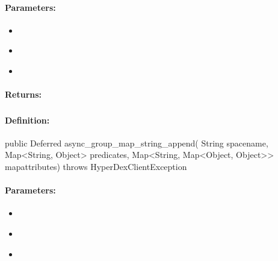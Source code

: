 \paragraph{Parameters:}
\begin{itemize}[noitemsep]
\item {}\\

\item {}\\

\item {}\\

\end{itemize}

\paragraph{Returns:}


\pagebreak
\subsubsection{}
\label{api:java:async_group_map_string_append}


\paragraph{Definition:}
\begin{javacode}
public Deferred async_group_map_string_append(
        String spacename,
        Map<String, Object> predicates,
        Map<String, Map<Object, Object>> mapattributes) throws HyperDexClientException
\end{javacode}

\paragraph{Parameters:}
\begin{itemize}[noitemsep]
\item {}\\

\item {}\\

\item {}\\

\end{itemize}

